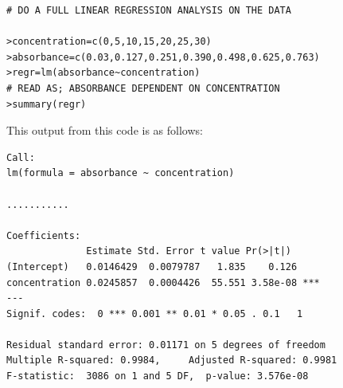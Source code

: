 \documentclass[a4paper,12pt]{article}
\begin{document}
{
	\normalsize
\begin{framed}
\begin{verbatim}
# DO A FULL LINEAR REGRESSION ANALYSIS ON THE DATA

>concentration=c(0,5,10,15,20,25,30)
>absorbance=c(0.03,0.127,0.251,0.390,0.498,0.625,0.763)
>regr=lm(absorbance~concentration)
# READ AS; ABSORBANCE DEPENDENT ON CONCENTRATION
>summary(regr)
\end{verbatim}
\end{framed}
}
This output from this code is as follows:
{
	\normalsize \begin{framed}
\begin{verbatim}
Call:
lm(formula = absorbance ~ concentration)

...........

Coefficients:
              Estimate Std. Error t value Pr(>|t|)
(Intercept)   0.0146429  0.0079787   1.835    0.126
concentration 0.0245857  0.0004426  55.551 3.58e-08 ***
---
Signif. codes:  0 *** 0.001 ** 0.01 * 0.05 . 0.1   1

Residual standard error: 0.01171 on 5 degrees of freedom
Multiple R-squared: 0.9984,     Adjusted R-squared: 0.9981
F-statistic:  3086 on 1 and 5 DF,  p-value: 3.576e-08

\end{verbatim}
\end{framed}
}\newpage
\end{document}
